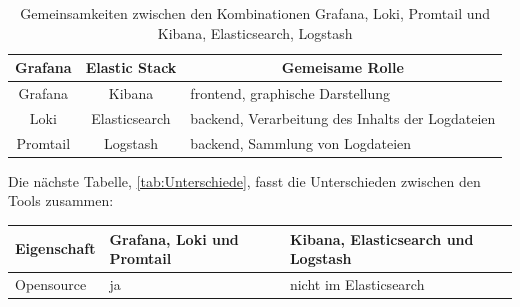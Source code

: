 \begin{table}[H]
   \begin{tabularx}{\textwidth}{|c|c|X|}
   \hline
   \multicolumn{1}{|c|}{\textbf{Grafana}} & \multicolumn{1}{|c|}{\textbf{Elastic Stack}} & \multicolumn{1}{|c|}{\textbf{Gemeisame Rolle}} \\
   \hline
      Grafana & Kibana & \gls{frontend}, graphische Darstellung\\
   \hline
      Loki & Elasticsearch & \gls{backend}, Verarbeitung des Inhalts der Logdateien \\
   \hline
      Promtail & Logstash & \gls{backend}, Sammlung von Logdateien \\
      \hline
   \end{tabularx}
   \caption[Gemeinsamkeiten zwischen den Kombinationen Grafana, Loki, Promtail und Kibana, Elasticsearch, Logstash]
   {Gemeinsamkeiten zwischen den Kombinationen Grafana, Loki, Promtail und Kibana, Elasticsearch, Logstash}
   \label{tab:Vergleich_GrafanaELK}
\end{table}

Die nächste Tabelle, \ref{tab:Unterschiede}, fasst die Unterschieden zwischen den Tools zusammen:

{
\begin{table}[H]
   \centering
\begin{tabular}{|m{5cm}|m{4.2cm}|>{\centering\arraybackslash}m{4.2cm}|}
   \hline
   \centering\textbf{Eigenschaft} & \centering\textbf{Grafana, Loki und Promtail} & \textbf{Kibana, Elasticsearch und Logstash} \\ 
   \hline 

   Opensource                  & \centering
   ja & 
   nicht im Elasticsearch \\ 
    \hline
 \end{tabular}
\end{table}
}

